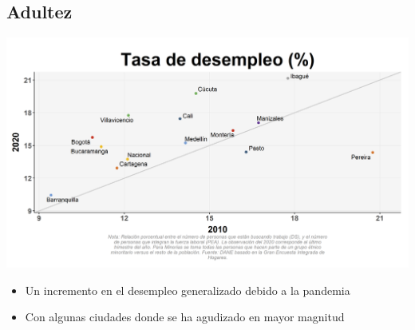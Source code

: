 \documentclass[aspectratio=169]{beamer}
\begin{document}
    \subsection{Adultez}

    \begin{slide}{15} 
            \begin{imagecolumn}
                \includegraphics[width=\columnwidth]{img/var_45_scatter_time.png}
            \end{imagecolumn}
            \begin{textcolumn}
                \begin{itemize}
                    \item Un incremento en el desempleo generalizado debido a la pandemia
                    \item Con algunas ciudades donde se ha agudizado en mayor magnitud
                \end{itemize}
            \end{textcolumn}
    \printcolumns
    \end{slide}
    
\end{document}
